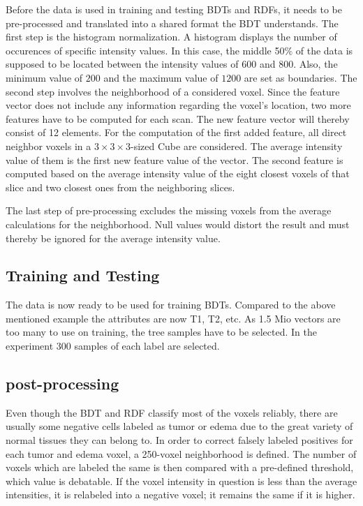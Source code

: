\documentclass[
12pt,
headsepline,
bibliography=totoc,
twoside=semi,
fleqn
]{scrartcl}
\begin{document}
 Before the data is used in training and testing BDTs and RDFs, it needs to be pre-processed and translated into a shared format the BDT understands. The first step is the histogram normalization. A histogram displays the number of occurences of specific intensity values. In this case, the middle 50$\%$ of the data is supposed to be located between the intensity values of $600$ and $800$. Also, the minimum value of $200$ and the maximum value of $1200$ are set as boundaries. The second step involves the neighborhood of a considered voxel. Since the feature vector does not include any information regarding the voxel's location, two more features have to be computed for each scan. The new feature vector will thereby consist of 12 elements. For the computation of the first added feature, all direct neighbor voxels in a $3 \times 3 \times 3$-sized Cube are considered. The average intensity value of them is the first new feature value of the vector. The second feature is computed based on the average intensity value of the eight closest voxels of that slice and two closest ones from the neighboring slices. 




 The last step of pre-processing excludes the missing voxels from the average calculations for the neighborhood. Null values would distort the result and must thereby be ignored for the average intensity value. 

 \subsection{Training and Testing\label{sec:sec3-3}}
 The data is now ready to be used for training BDTs. Compared to the above mentioned example the attributes are now T1, T2, etc. As 1.5 Mio vectors are too many to use on training, the tree samples have to be selected. In the experiment 300 samples of each label are selected.
 
 \subsection{post-processing\label{sec:sec3-4}}
 Even though the BDT and RDF classify most of the voxels reliably, there are usually some negative cells labeled as tumor or edema due to the great variety of normal tissues they can belong to. In order to correct falsely labeled positives for each tumor and edema voxel, a 250-voxel neighborhood is defined. The number of voxels which are labeled the same is then compared with a pre-defined threshold, which value is debatable. If the voxel intensity in question is less than the average intensities, it is relabeled into a negative voxel; it remains the same if it is higher.
\end{document}
